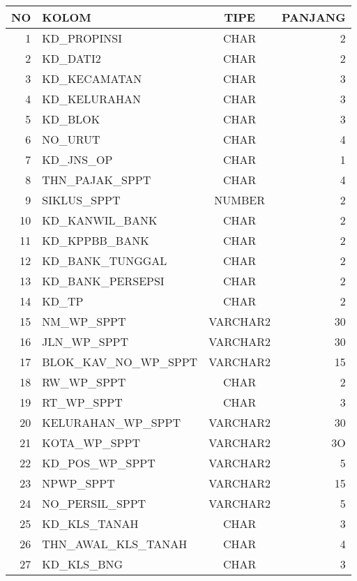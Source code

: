 \documentclass[pdftex,12pt, oneside]{article}
\begin{document}
\begin{enumerate}[1.]
  \begin{longtable}{|r|l|c|r|}
    \hline
    \textbf{NO} & \textbf{KOLOM} & \textbf{TIPE} & \textbf{PANJANG} \\
    \hline \hline
    1 & KD\_PROPINSI & CHAR & 2 \\
    \hline
    2 & KD\_DATI2 & CHAR & 2 \\
    \hline
    3 & KD\_KECAMATAN & CHAR & 3 \\
    \hline
    4 & KD\_KELURAHAN & CHAR & 3 \\
    \hline
    5 & KD\_BLOK & CHAR & 3 \\
    \hline
    6 & NO\_URUT & CHAR & 4 \\
    \hline
    7 & KD\_JNS\_OP & CHAR & 1 \\
    \hline
    8 & THN\_PAJAK\_SPPT & CHAR & 4 \\
    \hline
    9 & SIKLUS\_SPPT & NUMBER & 2 \\
    \hline
    10 & KD\_KANWIL\_BANK & CHAR & 2 \\
    \hline
    11 & KD\_KPPBB\_BANK & CHAR & 2 \\
    \hline
    12 & KD\_BANK\_TUNGGAL & CHAR & 2 \\
    \hline
    13 & KD\_BANK\_PERSEPSI & CHAR & 2 \\
    \hline
    14 & KD\_TP & CHAR & 2 \\
    \hline
    15 & NM\_WP\_SPPT & VARCHAR2 & 30 \\
    \hline
    16 & JLN\_WP\_SPPT & VARCHAR2 & 30 \\
    \hline
    17 & BLOK\_KAV\_NO\_WP\_SPPT & VARCHAR2 & 15 \\
    \hline
    18 & RW\_WP\_SPPT & CHAR & 2 \\
    \hline
    19 & RT\_WP\_SPPT & CHAR & 3 \\
    \hline
    20 & KELURAHAN\_WP\_SPPT & VARCHAR2 & 30 \\
    \hline
    21 & KOTA\_WP\_SPPT & VARCHAR2 & 3O \\
    \hline
    22 & KD\_POS\_WP\_SPPT & VARCHAR2 & 5 \\
    \hline
    23 & NPWP\_SPPT & VARCHAR2 & 15 \\
    \hline
    24 & NO\_PERSIL\_SPPT & VARCHAR2 & 5 \\
    \hline
    25 & KD\_KLS\_TANAH & CHAR & 3 \\
    \hline
    26 & THN\_AWAL\_KLS\_TANAH & CHAR & 4 \\
    \hline
    27 & KD\_KLS\_BNG & CHAR & 3 \\

\end{longtable}
\end{enumerate}
\end{document}
